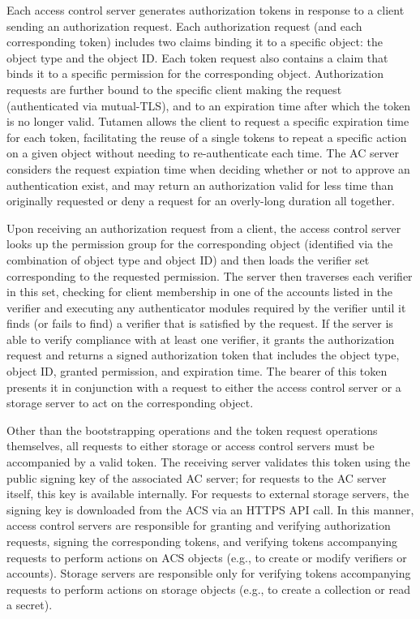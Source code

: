 Each access control server generates authorization tokens in response
to a client sending an authorization request. Each authorization
request (and each corresponding token) includes two claims binding it
to a specific object: the object type and the object ID. Each token
request also contains a claim that binds it to a specific permission
for the corresponding object. Authorization requests are further bound
to the specific client making the request (authenticated via
mutual-TLS), and to an expiration time after which the token is no
longer valid. Tutamen allows the client to request a specific
expiration time for each token, facilitating the reuse of a single
tokens to repeat a specific action on a given object without needing
to re-authenticate each time. The AC server considers the request
expiation time when deciding whether or not to approve an
authentication exist, and may return an authorization valid for less
time than originally requested or deny a request for an overly-long
duration all together.

Upon receiving an authorization request from a client, the access
control server looks up the permission group for the corresponding
object (identified via the combination of object type and object ID)
and then loads the verifier set corresponding to the requested
permission. The server then traverses each verifier in this set,
checking for client membership in one of the accounts listed in the
verifier and executing any authenticator modules required by the
verifier until it finds (or fails to find) a verifier that is
satisfied by the request. If the server is able to verify compliance
with at least one verifier, it grants the authorization request and
returns a signed authorization token that includes the object type,
object ID, granted permission, and expiration time. The bearer of this
token presents it in conjunction with a request to either the access
control server or a storage server to act on the corresponding object.

Other than the bootstrapping operations and the token request
operations themselves, all requests to either storage or access
control servers must be accompanied by a valid token. The receiving
server validates this token using the public signing key of the
associated AC server; for requests to the AC server itself, this key
is available internally. For requests to external storage servers, the
signing key is downloaded from the ACS via an HTTPS API call. In this
manner, access control servers are responsible for granting and
verifying authorization requests, signing the corresponding tokens,
and verifying tokens accompanying requests to perform actions on ACS
objects (e.g., to create or modify verifiers or accounts). Storage
servers are responsible only for verifying tokens accompanying
requests to perform actions on storage objects (e.g., to create a
collection or read a secret).

